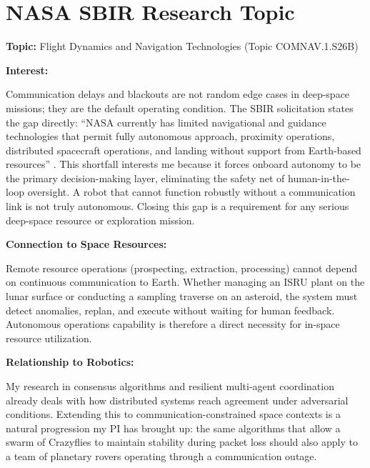 \documentclass[11pt]{article}
\begin{document}
\section*{NASA SBIR Research Topic}

\noindent\textbf{Topic:} Flight Dynamics and Navigation Technologies \cite{nasaSBIR} (Topic COMNAV.1.S26B)

\noindent\textbf{Interest:}

Communication delays and blackouts are not random edge cases in deep-space missions; they are the default operating condition.
The SBIR solicitation states the gap directly: ``NASA currently has limited navigational and guidance technologies that permit fully
autonomous approach, proximity operations, distributed spacecraft operations, and landing without support from Earth-based resources''
\cite{nasaSBIR}. This shortfall interests me because it forces onboard autonomy to be the primary decision-making layer, eliminating
the safety net of human-in-the-loop oversight. A robot that cannot function robustly without a communication link is not truly autonomous.
Closing this gap is a requirement for any serious deep-space resource or exploration mission.

\noindent\textbf{Connection to Space Resources:}

Remote resource operations (prospecting, extraction, processing) cannot depend on continuous communication
to Earth. Whether managing an ISRU plant on the lunar surface or conducting a sampling traverse on an asteroid, the system must detect anomalies, replan,
and execute without waiting for human feedback. Autonomous operations capability is therefore a direct necessity for in-space resource utilization.

\noindent\textbf{Relationship to Robotics:}

My research in consensus algorithms and resilient multi-agent coordination already deals with how distributed
systems reach agreement under adversarial conditions. Extending this to communication-constrained space contexts is a natural progression my PI has brought up:
the same algorithms that allow a swarm of Crazyflies to maintain stability during packet loss should also apply to a team of planetary rovers operating through
a communication outage.

\end{document}
